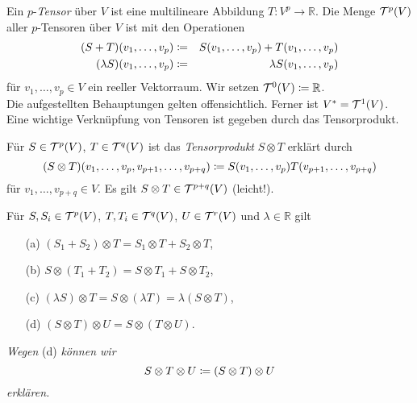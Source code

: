 \documentclass[a4paper,twoside,DIV15,BCOR12mm]{scrbook}
\begin{document}
\bigskip

 Ein $p$-{\em Tensor} über $V$ ist eine 
multilineare Abbildung $T: V^{p} \to {\mathbb R}$. Die Menge ${\cal 
T}^{p}(V)$ aller $p$-Tensoren über $V$ ist mit den Operationen 
\begin{eqnarray*}
(S + T)(v_{1},\dots,v_{p}) & \da  & S(v_{1},\dots,v_{p}) + 
T(v_{1},\dots,v_{p}) \\
(\lambda S)(v_{1},\dots,v_{p}) & \da  & \lambda S(v_{1},\dots,v_{p})
\end{eqnarray*}
für $v_{1},\dots,v_{p} \in V$ 
ein reeller Vektorraum. Wir setzen ${\cal T}^{0}(V) \da  {\mathbb R}$.\\

\noindent
Die aufgestellten Behauptungen gelten offensichtlich. Ferner ist 
$V^{*} = {\cal T}^{1}(V)$.\\

\noindent
Eine wichtige Verknüpfung von Tensoren ist gegeben durch das Tensorprodukt.

\bigskip

 Für $S \in {\cal T}^{p}(V)$, $T \in 
{\cal T}^{q}(V)$ ist das {\em Tensorprodukt} $S \otimes T$ erklärt durch
\[ (S \otimes T)(v_{1},\dots,v_{p},v_{p+1},\dots,v_{p+q}) \da  
S(v_{1},\dots,v_{p})T(v_{p+1},\dots,v_{p+q}) \]
für $v_{1},\dots,v_{p+q} \in V$. Es gilt $S \otimes T \in {\cal 
T}^{p+q}(V)$ (leicht!).

\bigskip

\begin{satz}\label{Satz3.3.1} {Für $S, S_{i} \in {\cal T}^{p}(V)$, 
$T, T_{i} \in {\cal T}^{q}(V)$, $U \in {\cal T}^{r}(V)$ und $\lambda 
\in {\mathbb R}$ gilt}
\begin{enumerate}
\item[{\rm (a)}] $(S_{1} + S_{2}) \otimes T = S_{1} \otimes T + S_{2} \otimes T$,
\item[{\rm (b)}] $S \otimes (T_{1} + T_{2}) = S \otimes T_{1} + S \otimes T_{2}$,
\item[{\rm (c)}] $(\lambda S) \otimes T = S \otimes (\lambda T) = \lambda(S 
\otimes T)$,
\item[{\rm (d)}] $(S \otimes T) \otimes U = S \otimes (T \otimes U)$.
\end{enumerate}
\end{satz}

\noindent
{\em Wegen} (d) {\em können wir
\[ S \otimes T \otimes U \da  (S \otimes T) \otimes U \]
erklären.}\\
\end{document}
